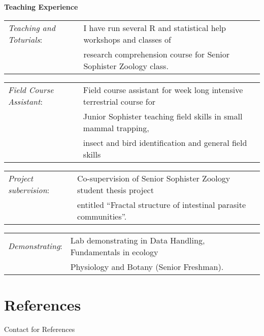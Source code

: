 \documentclass[10pt,a4paper]{article}
\begin{document}
\bigskip

\raggedright\textbf{Teaching Experience}\\
\begin{tabular}{ll}
\textit{Teaching and Toturials}:&I have run several R and statistical help workshops and classes of\\
& research comprehension course for Senior Sophister Zoology class.\\

\end{tabular}


\begin{tabular}{ll}
\textit{Field Course Assistant}:& Field course assistant for week long intensive terrestrial course for\\ 
&  Junior Sophister teaching field skills in small mammal trapping,\\
&insect and bird identification and general field skills\\
\end{tabular}

\begin{tabular}{ll}
\textit{Project subervision}:&\hspace{7.5mm}Co-supervision of Senior Sophister Zoology student thesis project\\
&\hspace{7.5mm}entitled “Fractal structure of intestinal parasite communities”.\\

\end{tabular}

\begin{tabular}{ll}
\textit{Demonstrating}:&\hspace{15mm}Lab demonstrating in Data Handling, Fundamentals in ecology\\ 
&\hspace{15mm}Physiology and Botany (Senior Freshman).\\

\end{tabular}

\bigskip
\section{References}
Contact for References


\bigskip
\end{document}
